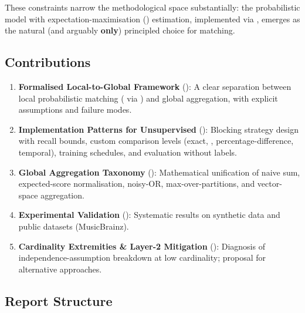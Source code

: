 These constraints narrow the methodological space substantially: the \fellegisunter{} probabilistic model with expectation-maximisation (\emalgo{}) estimation, implemented via \splink{}, emerges as the natural (and arguably \textbf{only}) principled choice for matching.

\subsection{Contributions}
\label{sec:contributions}

\begin{enumerate}
	\item \textbf{Formalised Local-to-Global Framework} (): A clear separation between local probabilistic matching (\fellegisunter{} via \splink{}) and global aggregation, with explicit assumptions and failure modes.
	\item \textbf{Implementation Patterns for Unsupervised \splink{}} (): Blocking strategy design with recall bounds, custom comparison levels (exact, \jw{}, percentage-difference, temporal), \emalgo{} training schedules, and evaluation without labels.
	\item \textbf{Global Aggregation Taxonomy} (): Mathematical unification of naive sum, expected-score normalisation, noisy-OR, max-over-partitions, and vector-space aggregation.
	\item \textbf{Experimental Validation} (): Systematic results on synthetic data and public datasets (MusicBrainz).
	\item \textbf{Cardinality Extremities \& Layer-2 Mitigation} (): Diagnosis of independence-assumption breakdown at low cardinality; proposal for alternative approaches.
\end{enumerate}

\subsection{Report Structure}
\label{sec:structure}

